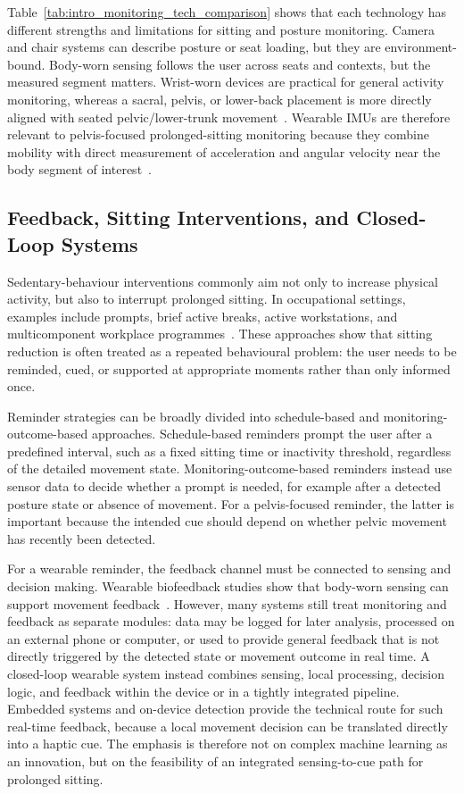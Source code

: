 Table~\ref{tab:intro_monitoring_tech_comparison} shows that each technology has different strengths and limitations for sitting and posture monitoring. Camera and chair systems can describe posture or seat loading, but they are environment-bound. Body-worn sensing follows the user across seats and contexts, but the measured segment matters. Wrist-worn devices are practical for general activity monitoring, whereas a sacral, pelvis, or lower-back placement is more directly aligned with seated pelvic/lower-trunk movement~\citep{liao2026imu_pelvic_rotation}. Wearable IMUs are therefore relevant to pelvis-focused prolonged-sitting monitoring because they combine mobility with direct measurement of acceleration and angular velocity near the body segment of interest~\citep{papi2017wearable}.

\subsection{Feedback, Sitting Interventions, and Closed-Loop Systems}

Sedentary-behaviour interventions commonly aim not only to increase physical activity, but also to interrupt prolonged sitting. In occupational settings, examples include prompts, brief active breaks, active workstations, and multicomponent workplace programmes~\citep{pronk2012take,ojo2018active,hargreaves2023move}. These approaches show that sitting reduction is often treated as a repeated behavioural problem: the user needs to be reminded, cued, or supported at appropriate moments rather than only informed once.

Reminder strategies can be broadly divided into schedule-based and monitoring-outcome-based approaches. Schedule-based reminders prompt the user after a predefined interval, such as a fixed sitting time or inactivity threshold, regardless of the detailed movement state. Monitoring-outcome-based reminders instead use sensor data to decide whether a prompt is needed, for example after a detected posture state or absence of movement. For a pelvis-focused reminder, the latter is important because the intended cue should depend on whether pelvic movement has recently been detected.

For a wearable reminder, the feedback channel must be connected to sensing and decision making. Wearable biofeedback studies show that body-worn sensing can support movement feedback~\citep{battis2024wearable}. However, many systems still treat monitoring and feedback as separate modules: data may be logged for later analysis, processed on an external phone or computer, or used to provide general feedback that is not directly triggered by the detected state or movement outcome in real time. A closed-loop wearable system instead combines sensing, local processing, decision logic, and feedback within the device or in a tightly integrated pipeline. Embedded systems and on-device detection provide the technical route for such real-time feedback, because a local movement decision can be translated directly into a haptic cue. The emphasis is therefore not on complex machine learning as an innovation, but on the feasibility of an integrated sensing-to-cue path for prolonged sitting.


